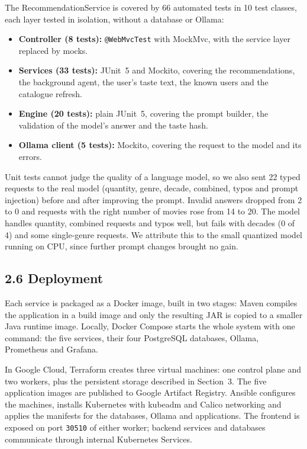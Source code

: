 \documentclass[10pt,a4paper]{article}
\begin{document}
The RecommendationService is covered by 66 automated tests in 10 test classes, each layer tested in isolation, without a database or Ollama:
\begin{itemize}
  \item \textbf{Controller (8 tests):} \texttt{@WebMvcTest} with MockMvc, with the service layer replaced by mocks.
  \item \textbf{Services (33 tests):} JUnit~5 and Mockito, covering the recommendations, the background agent, the user's taste text, the known users and the catalogue refresh.
  \item \textbf{Engine (20 tests):} plain JUnit~5, covering the prompt builder, the validation of the model's answer and the taste hash.
  \item \textbf{Ollama client (5 tests):} Mockito, covering the request to the model and its errors.
\end{itemize}

Unit tests cannot judge the quality of a language model, so we also sent 22 typed requests to the real model (quantity, genre, decade,
combined, typos and prompt injection) before and after improving the prompt. Invalid answers dropped from 2 to 0 and requests with the
right number of movies rose from 14 to 20. The model handles quantity, combined requests and typos well, but fails with decades (0 of 4)
and some single-genre requests. We attribute this to the small quantized model running on CPU, since further prompt changes brought no gain.

\subsection*{2.6 Deployment}

Each service is packaged as a Docker image, built in two stages: Maven compiles the application in a build image and only the resulting
JAR is copied to a smaller Java runtime image. Locally, Docker Compose starts the whole system with one command: the five services, their
four PostgreSQL databases, Ollama, Prometheus and Grafana.

In Google Cloud, Terraform creates three virtual machines: one control plane and two workers, plus the persistent storage described in Section~3. The five application images are published to Google Artifact Registry. Ansible configures the machines, installs Kubernetes with kubeadm and Calico networking and applies the manifests for the databases, Ollama and applications. The frontend is exposed on port \texttt{30510} of either worker; backend services and databases communicate through internal Kubernetes Services.
\end{document}
